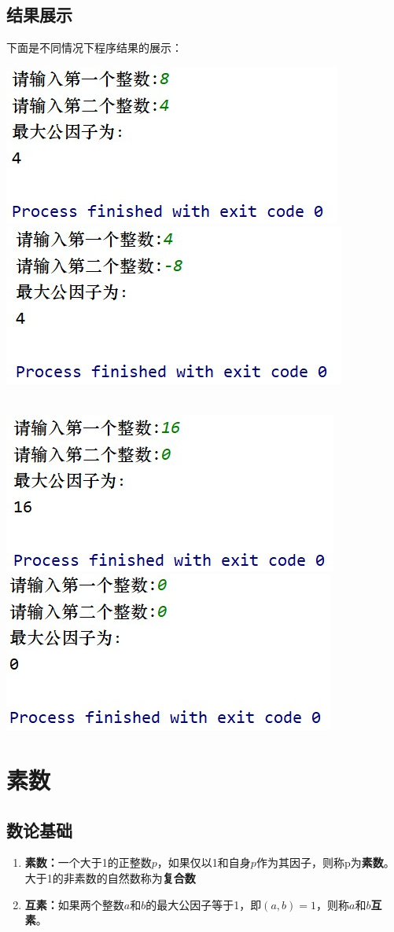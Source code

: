 \documentclass[UTF8]{ctexart}
\begin{document}
\subsection{结果展示}
\par 下面是不同情况下程序结果的展示：\\
\par
\includegraphics[width=.4\textwidth]{1.1.jpg}\;\;\;\;\;\;\;\;\;\;\;\;\;\;\;\;\;\;\;\;\;\;\;\;
\includegraphics[width=.4\textwidth]{1.2.jpg}\\ \\
\par
\includegraphics[width=.4\textwidth]{1.3.jpg}\;\;\;\;\;\;\;\;\;\;\;\;\;\;\;\;\;\;\;\;\;\;\;\;
\includegraphics[width=.4\textwidth]{1.4.jpg}

\section{素数}
\subsection{数论基础}
\begin{enumerate}[(1)]
\item \textbf{素数：}一个大于1的正整数$p$，如果仅以1和自身$p$作为其因子，则称p为\textbf{素数}。大于1的非素数的自然数称为\textbf{复合数}
\item \textbf{互素：}如果两个整数$a$和$b$的最大公因子等于1，即$(a,b)=1$，则称$a$和$b$\textbf{互素}。
\end{enumerate}
\end{document}
